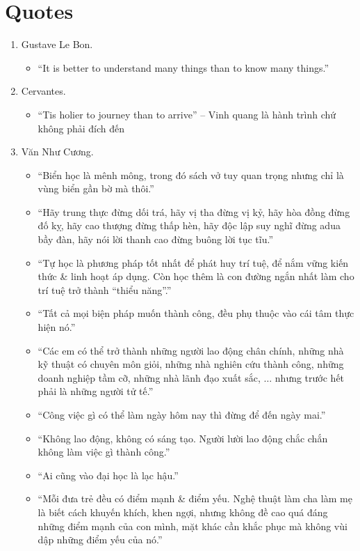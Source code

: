 \documentclass{article}
\begin{document}

\section{Quotes}

\begin{enumerate}
	\item {\sc Gustave Le Bon.}
	\begin{itemize}
		\item ``It is better to understand many things than to know many things.''
	\end{itemize}
	\item {\sc Cervantes.}
	\begin{itemize}
		\item ``Tis holier to journey than to arrive'' -- Vinh quang là hành trình chứ không phải đích đến \cite[Suy ngẫm 2000, p. 269]{Leighton_Feyman_last_journey_VN}
	\end{itemize}
	\item {\sc Văn Như Cương.}
	\begin{itemize}
		\item ``Biển học là mênh mông, trong đó sách vở tuy quan trọng nhưng chỉ là vùng biển gần bờ mà thôi.''
		\item ``Hãy trung thực đừng dối trá, hãy vị tha đừng vị kỷ, hãy hòa đồng đừng đố kỵ, hãy cao thượng đừng thấp hèn, hãy độc lập suy nghĩ đừng adua bầy đàn, hãy nói lời thanh cao đừng buông lời tục tĩu.''
		\item ``Tự học là phương pháp tốt nhất để phát huy trí tuệ, để nắm vững kiến thức \& linh hoạt áp dụng. Còn học thêm là con đường ngắn nhất làm cho trí tuệ trở thành ``thiểu năng''.''
		\item ``Tất cả mọi biện pháp muốn thành công, đều phụ thuộc vào cái tâm thực hiện nó.''
		\item ``Các em có thể trở thành những người lao động chân chính, những nhà kỹ thuật có chuyên môn giỏi, những nhà nghiên cứu thành công, những doanh nghiệp tầm cỡ, những nhà lãnh đạo xuất sắc, $\ldots$ nhưng trước hết phải là những người tử tế.''
		\item ``Công việc gì có thể làm ngày hôm nay thì đừng để đến ngày mai.''
		\item ``Không lao động, không có sáng tạo. Người lười lao động chắc chắn không làm việc gì thành công.''
		\item ``Ai cũng vào đại học là lạc hậu.''
		\item ``Mỗi đưa trẻ đều có điểm mạnh \& điểm yếu. Nghệ thuật làm cha làm mẹ là biết cách khuyến khích, khen ngợi, nhưng không đề cao quá đáng những điểm mạnh của con mình, mặt khác cần khắc phục mà không vùi dập những điểm yếu của nó.''

\end{itemize}
\end{enumerate}
\end{document}
